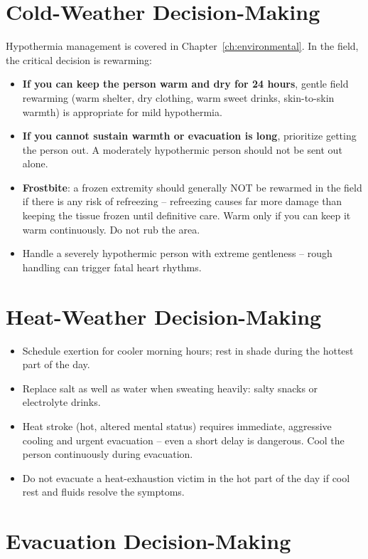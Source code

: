 \section{Cold-Weather Decision-Making}

Hypothermia management is covered in Chapter~\ref{ch:environmental}. In the field, the critical decision is rewarming:

\begin{itemize}[leftmargin=*]
  \item \textbf{If you can keep the person warm and dry for 24 hours}, gentle field rewarming (warm shelter, dry clothing, warm sweet drinks, skin-to-skin warmth) is appropriate for mild hypothermia.
  \item \textbf{If you cannot sustain warmth or evacuation is long}, prioritize getting the person out. A moderately hypothermic person should not be sent out alone.
  \item \textbf{Frostbite}: a frozen extremity should generally NOT be rewarmed in the field if there is any risk of refreezing -- refreezing causes far more damage than keeping the tissue frozen until definitive care. Warm only if you can keep it warm continuously. Do not rub the area.
  \item Handle a severely hypothermic person with extreme gentleness -- rough handling can trigger fatal heart rhythms.
\end{itemize}

\section{Heat-Weather Decision-Making}

\begin{itemize}[leftmargin=*]
  \item Schedule exertion for cooler morning hours; rest in shade during the hottest part of the day.
  \item Replace salt as well as water when sweating heavily: salty snacks or electrolyte drinks.
  \item Heat stroke (hot, altered mental status) requires immediate, aggressive cooling and urgent evacuation -- even a short delay is dangerous. Cool the person continuously during evacuation.
  \item Do not evacuate a heat-exhaustion victim in the hot part of the day if cool rest and fluids resolve the symptoms.
\end{itemize}

\section{Evacuation Decision-Making}

